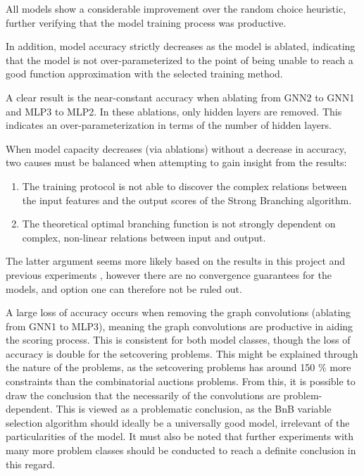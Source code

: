 All models show a considerable improvement over the random choice heuristic, further verifying that the model training process was productive. 

In addition, model accuracy strictly decreases as the model is ablated, indicating that the model is not over-parameterized to the point of being unable to reach a good function approximation with the selected training method. 

A clear result is the near-constant accuracy when ablating from GNN2 to GNN1 and MLP3 to MLP2. In these ablations, only hidden layers are removed. This indicates an over-parameterization in terms of the number of hidden layers.


When model capacity decreases (via ablations) without a decrease in accuracy, two causes must be balanced when attempting to gain insight from the results: 
\begin{enumerate}[label=(\roman*)]
    \item The training protocol is not able to discover the complex relations between the input features and the output scores of the Strong Branching algorithm.
    \item The theoretical optimal branching function is not strongly dependent on complex, non-linear relations between input and output.
\end{enumerate}
The latter argument seems more likely based on the results in this project and previous experiments \cite{gupta2020hybrid} \cite{gasse2019exact}, however there are no convergence guarantees for the models, and option one can therefore not be ruled out.





A large loss of accuracy occurs when removing the graph convolutions (ablating from GNN1 to MLP3), meaning the graph convolutions are productive in aiding the scoring process. This is consistent for both model classes, though the loss of accuracy is double for the setcovering problems. This might be explained through the nature of the problems, as the setcovering problems has around 150 \% more constraints than the combinatorial auctions problems. From this, it is possible to draw the conclusion that the necessarily of the convolutions are problem-dependent. This is viewed as a problematic conclusion, as the \gls{BnB} variable selection algorithm should ideally be a universally good model, irrelevant of the particularities of the model. It must also be noted that further experiments with many more problem classes should be conducted to reach a definite conclusion in this regard. 

